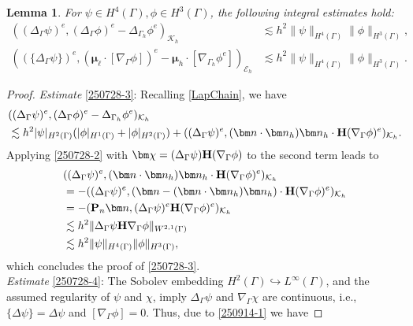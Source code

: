 \documentclass[10pt, a4paper]{amsart}
\newcommand{\bn}{{\bm n}}
\newcommand{\nab}{\nabla}
\newcommand{\bmu}{{\bm \mu}}
\newcommand{\calE}{\mathcal{E}}
\newcommand{\calK}{\mathcal{K}}
\newcommand{\bchi}{{\bm \chi}}
\newtheorem{lemma}[theorem]{Lemma}
\theoremstyle{definition}
\theoremstyle{remark}
\theoremstyle{example}
\numberwithin{equation}{section}
\begin{document}
\begin{lemma} \label{250902-2}
For $\psi \in H^4(\Gamma), \phi \in H^3(\Gamma)$, the following integral estimates hold:
\begin{align}
((\Delta_\Gamma\psi)^e, (\Delta_\Gamma\phi)^e - \Delta_{\Gamma_h}\phi^e)_{\calK_h}
& \lesssim h^2\|\psi\|_{H^4(\Gamma)}\|\phi\|_{H^3(\Gamma)}, \label{250728-3} \\
((\{\Delta_\Gamma\psi\})^e, (\bmu_\ell \cdot [\nab_\Gamma\phi])^e - \bmu_h \cdot [\nab_{\Gamma_h}\phi^e])_{\calE_h}
& \lesssim h^2\|\psi\|_{H^4(\Gamma)}\|\phi\|_{H^3(\Gamma)}. \label{250728-4}
\end{align}
\end{lemma}

\begin{proof}
\textit{Estimate} \eqref{250728-3}: Recalling \eqref{LapChain}, we have
\begin{align*}
& ((\Delta_\Gamma\psi)^e, (\Delta_\Gamma\phi)^e - \Delta_{\Gamma_h}\phi^e)_{\calK_h} \\
& \lesssim h^2|\psi|_{H^2(\Gamma)}(|\phi|_{H^1(\Gamma)} + |\phi|_{H^2(\Gamma)}) + ((\Delta_\Gamma\psi)^e, (\bn \cdot \bn_h)\bn_h \cdot {\bf H}(\nab_\Gamma\phi)^e)_{\calK_h}.
\end{align*}
%
Applying \eqref{250728-2} with $\bchi = (\Delta_\Gamma\psi){\bf H}(\nab_\Gamma\phi)$ to the second term leads to
%
\begin{align*}
& ((\Delta_\Gamma\psi)^e, (\bn \cdot \bn_h)\bn_h \cdot {\bf H}(\nab_\Gamma\phi)^e)_{\calK_h} \\
& = -((\Delta_\Gamma\psi)^e, (\bn - (\bn \cdot \bn_h)\bn_h) \cdot {\bf H}(\nab_\Gamma\phi)^e)_{\calK_h} \\
& = -({\bf P}_n\bn, (\Delta_\Gamma\psi)^e{\bf H}(\nab_\Gamma\phi)^e)_{\calK_h} \\
& \lesssim h^2\|\Delta_\Gamma\psi{\bf H}\nab_\Gamma\phi\|_{W^{2, 1}(\Gamma)} \\
%
& \lesssim h^2\|\psi\|_{H^4(\Gamma)}\|\phi\|_{H^3(\Gamma)},
\end{align*}
which concludes the proof of \eqref{250728-3}. \\
\textit{Estimate} \eqref{250728-4}: The Sobolev embedding $H^2(\Gamma) \hookrightarrow L^\infty(\Gamma)$, and the assumed regularity of $\psi$ and $\chi$, imply $\Delta_\Gamma\psi$ and $\nab_\Gamma\chi$ are continuous, i.e., $\{\Delta\psi\} = \Delta\psi$ and $[\nab_\Gamma\phi] = 0$. Thus, due to \eqref{250914-1} we have

\end{proof}
\end{document}
